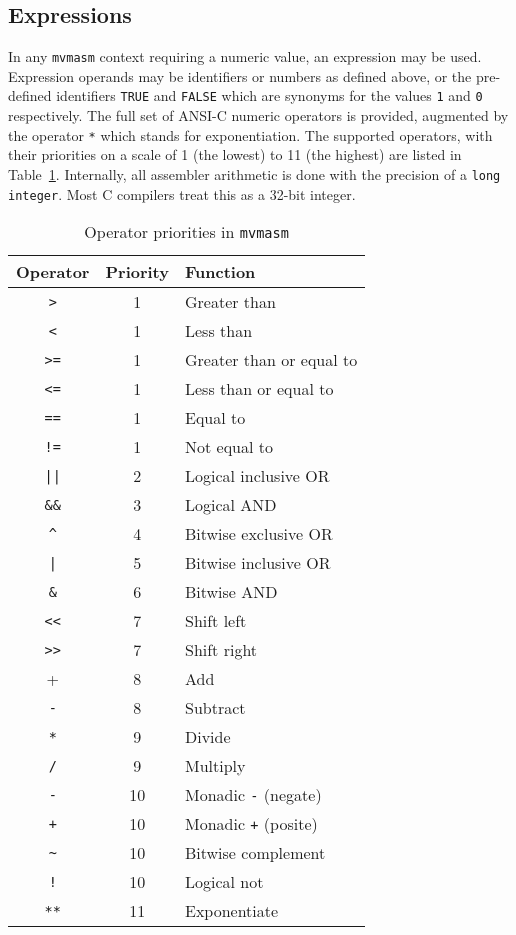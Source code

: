 \subsection{Expressions}
In any {\tt mvmasm} context requiring a numeric value, an expression may
be used. Expression operands may be identifiers or numbers as defined
above, or the pre-defined identifiers {\tt TRUE} and {\tt FALSE} which
are synonyms for the values {\tt 1} and {\tt 0} respectively. The full
set of ANSI-C numeric operators is provided, augmented by the operator
{\tt **} which stands for exponentiation. The supported operators, with
their priorities on a scale  of 1 (the lowest) to 11 (the highest)
are listed in Table~\ref{mvmasm:operators}.
Internally, all assembler arithmetic is done with the precision of a {\tt long integer}. 
Most C compilers treat this as a 32-bit integer.

\begin{table}
\begin{center}
\begin{tabular}{|c|c|l|}
\hline
Operator&Priority&Function\\
\hline
\verb+>+&1&Greater than\\
\verb+<+&1&Less than\\
\verb+>=+&1&Greater than or equal to\\
\verb+<=+&1&Less than or equal to\\
\verb+==+&1&Equal to\\
\verb+!=+&1&Not equal to\\
\hline
\verb+||+&2&Logical inclusive OR\\
\hline
\verb+&&+&3&Logical AND\\
\hline
\verb+^+&4&Bitwise exclusive OR\\
\hline
\verb+|+&5&Bitwise inclusive OR\\
\hline
\verb+&+&6&Bitwise AND\\
\hline
\verb+<<+&7&Shift left \\
\verb+>>+&7&Shift right\\
\hline
\verb+++&8&Add\\
\verb+-+&8&Subtract\\
\hline
\verb+*+&9&Divide\\
\verb+/+&9&Multiply\\
\hline
\verb+-+&10&Monadic {\tt -} (negate)\\
\verb-+-&10&Monadic {\tt +} (posite)\\
\verb+~+&10&Bitwise complement\\
\verb+!+&10&Logical not\\
\hline
\verb+**+&11&Exponentiate\\
\hline
\end{tabular}
\end{center}
\caption{Operator priorities in {\tt mvmasm}}
\label{mvmasm:operators}
\end{table}

